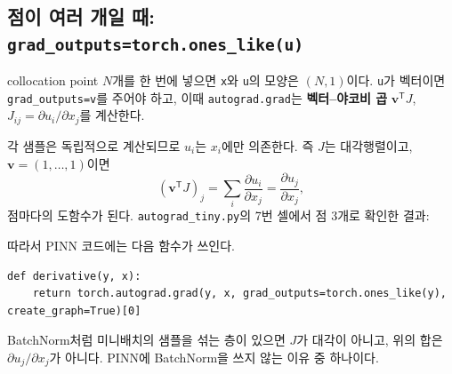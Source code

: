\documentclass[11pt,a4paper]{article}
\newcommand{\vect}[1]{\bm{#1}}
\newcommand{\T}{^{\mathsf T}}
\newcommand{\pd}[2]{\frac{\partial #1}{\partial #2}}
\begin{document}
\subsection{점이 여러 개일 때: \texttt{grad\_outputs=torch.ones\_like(u)}}

collocation point $N$개를 한 번에 넣으면 \texttt{x}와 \texttt{u}의 모양은 $(N,1)$이다.
\texttt{u}가 벡터이면 \texttt{grad\_outputs=v}를 주어야 하고, 이때 \texttt{autograd.grad}는 \textbf{벡터--야코비 곱} $\vect v\T J$, $J_{ij}=\partial u_i/\partial x_j$를 계산한다.

각 샘플은 독립적으로 계산되므로 $u_i$는 $x_i$에만 의존한다. 즉 $J$는 대각행렬이고, $\vect v=(1,\ldots,1)$이면
\[
(\vect v\T J)_j=\sum_i \pd{u_i}{x_j}=\pd{u_j}{x_j},
\]
점마다의 도함수가 된다. \texttt{autograd\_tiny.py}의 7번 셀에서 점 $3$개로 확인한 결과:
\begin{center}
\end{center}
따라서 PINN 코드에는 다음 함수가 쓰인다.
\begin{lstlisting}
def derivative(y, x):
    return torch.autograd.grad(y, x, grad_outputs=torch.ones_like(y), create_graph=True)[0]
\end{lstlisting}

\begin{thinkbox}
BatchNorm처럼 미니배치의 샘플을 섞는 층이 있으면 $J$가 대각이 아니고, 위의 합은 $\partial u_j/\partial x_j$가 아니다.
PINN에 BatchNorm을 쓰지 않는 이유 중 하나이다.
\end{thinkbox}
\end{document}
